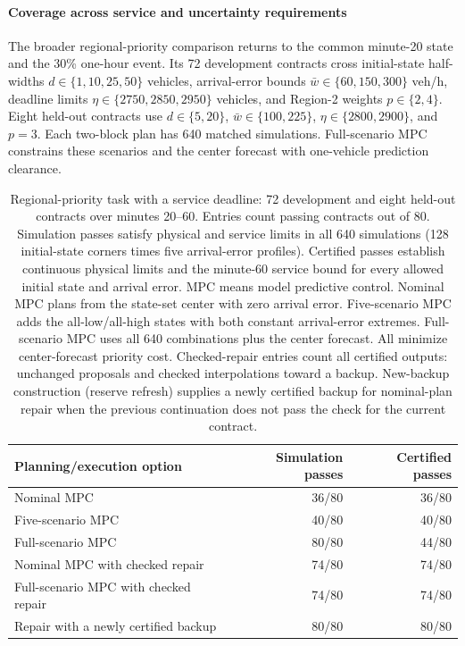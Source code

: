\documentclass[preprint,12pt]{elsarticle}
\theoremstyle{definition}
\theoremstyle{plain}
\theoremstyle{definition}
\theoremstyle{plain}
\begin{document}
\paragraph{Coverage across service and uncertainty requirements}
The broader regional-priority comparison returns to the common minute-20 state and
the 30\% one-hour event. Its 72 development contracts cross initial-state
half-widths $d\in\{1,10,25,50\}$ vehicles, arrival-error bounds
$\bar w\in\{60,150,300\}$ veh/h, deadline limits
$\eta\in\{2750,2850,2950\}$ vehicles, and Region-2 weights $p\in\{2,4\}$.
Eight held-out contracts use $d\in\{5,20\}$,
$\bar w\in\{100,225\}$, $\eta\in\{2800,2900\}$, and $p=3$.
Each two-block plan has 640 matched simulations. Full-scenario MPC constrains
these scenarios and the center forecast with one-vehicle prediction
clearance.

\begin{table}[!htbp]
\centering\small
\setlength{\belowcaptionskip}{6pt}
\caption{Regional-priority task with a service deadline: 72 development and eight held-out
contracts over minutes 20--60. Entries count passing contracts out of 80.
Simulation passes satisfy physical and service limits in all 640 simulations
(128 initial-state corners times five arrival-error profiles).
Certified passes establish continuous physical limits and the minute-60 service
bound for every allowed initial state and arrival error. MPC means model predictive control.
Nominal MPC plans from the state-set center with zero arrival error.
Five-scenario MPC adds the all-low/all-high states with both constant
arrival-error extremes. Full-scenario MPC uses all 640 combinations plus the
center forecast. All minimize center-forecast priority cost. Checked-repair
entries count all certified outputs: unchanged proposals and checked
interpolations toward a backup. New-backup construction (reserve refresh) supplies a newly certified
backup for nominal-plan repair when the previous continuation does not
pass the check for the current contract.}
\label{tab:benchmark-deadlines}
\begin{tabular}{@{}lrr@{}}
\toprule
Planning/execution option & Simulation passes & Certified passes\\
\midrule
Nominal MPC & 36/80 & 36/80\\
Five-scenario MPC & 40/80 & 40/80\\
Full-scenario MPC & 80/80 & 44/80\\
Nominal MPC with checked repair & 74/80 & 74/80\\
Full-scenario MPC with checked repair & 74/80 & 74/80\\
Repair with a newly certified backup & 80/80 & 80/80\\
\bottomrule
\end{tabular}
\end{table}
\end{document}

